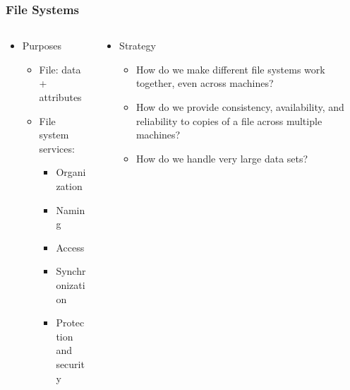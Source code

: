 \begin{frame}[t]
	\frametitle{File Systems}
	\begin{columns}[t]
		\begin{column}{.5\textwidth}
			
			\begin{itemize}\Large
				\item Purposes
				\begin{itemize}\large
					\item File: data + attributes
					\item File system services:
					\begin{itemize}\large
						\item Organization
						\item Naming
						\item Access
						\item Synchronization
						\item Protection and security
	
					\end{itemize}					
				\end{itemize}
			\end{itemize}
			
		\end{column}
		
		\begin{column}{.5\textwidth}
			
			\begin{itemize}\Large
				\item Strategy
				\begin{itemize}\large
					\item How do we make different file
					systems work together, even across
					machines?
					\item How do we provide consistency,
					availability, and reliability to copies
					of a file across multiple machines?
					\item How do we handle very large data
					sets?
					
				\end{itemize}
			\end{itemize}
			
		\end{column}
	\end{columns}
\end{frame}


